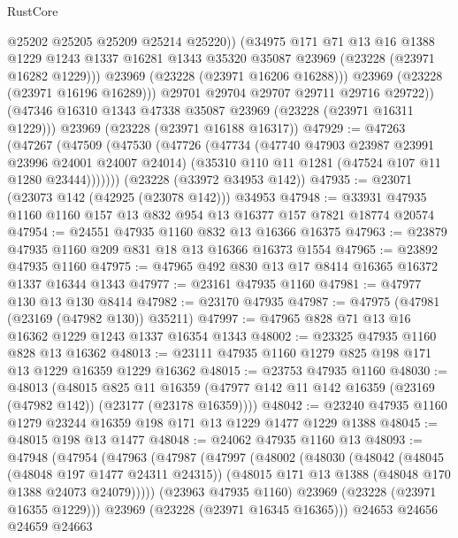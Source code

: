 \begin{lexlean}{RustCore}
\begin{coremodule}
                @25202
                @25205
                @25209
                @25214
                @25220))
            (@34975
              @171
              @71
              @13
              @16
              @1388
              @1229
              @1243
              @1337
              @16281
              @1343
              @35320
              @35087
              @23969
              (@23228 (@23971 @16282 @1229)))
            @23969
            (@23228 (@23971 @16206 @16288)))
          @23969
          (@23228 (@23971 @16196 @16289)))
        @29701
        @29704
        @29707
        @29711
        @29716
        @29722))
    (@47346 @16310 @1343 @47338 @35087 @23969 (@23228 (@23971 @16311 @1229)))
    @23969
    (@23228 (@23971 @16188 @16317))
@47929 := @47263
    (@47267
      (@47509
        (@47530
          (@47726
            (@47734
              (@47740 @47903 @23987 @23991 @23996 @24001 @24007 @24014)
              (@35310 @110 @11 @1281 (@47524 @107 @11 @1280 @23444)))))))
    (@23228 (@33972 @34953 @142))
@47935 := @23071 (@23073 @142 (@42925 (@23078 @142))) @34953
@47948 := @33931 @47935 @1160 @1160 @157 @13 @832 @954 @13 @16377 @157 @7821 @18774 @20574
@47954 := @24551 @47935 @1160 @832 @13 @16366 @16375
@47963 := @23879 @47935 @1160 @209 @831 @18 @13 @16366 @16373 @1554
@47965 := @23892 @47935 @1160
@47975 := @47965 @492 @830 @13 @17 @8414 @16365 @16372 @1337 @16344 @1343
@47977 := @23161 @47935 @1160
@47981 := @47977 @130 @13 @130 @8414
@47982 := @23170 @47935
@47987 := @47975 (@47981 (@23169 (@47982 @130)) @35211)
@47997 := @47965 @828 @71 @13 @16 @16362 @1229 @1243 @1337 @16354 @1343
@48002 := @23325 @47935 @1160 @828 @13 @16362
@48013 := @23111 @47935 @1160 @1279 @825 @198 @171 @13 @1229 @16359 @1229 @16362
@48015 := @23753 @47935 @1160
@48030 := @48013
    (@48015
      @825
      @11
      @16359
      (@47977 @142 @11 @142 @16359 (@23169 (@47982 @142)) (@23177 (@23178 @16359))))
@48042 := @23240 @47935 @1160 @1279 @23244 @16359 @198 @171 @13 @1229 @1477 @1229 @1388
@48045 := @48015 @198 @13 @1477
@48048 := @24062 @47935 @1160 @13
@48093 := @47948
    (@47954
      (@47963
        (@47987
          (@47997
            (@48002
              (@48030
                (@48042
                  (@48045 (@48048 @197 @1477 @24311 @24315))
                  (@48015 @171 @13 @1388 (@48048 @170 @1388 @24073 @24079)))))
            (@23963 @47935 @1160)
            @23969
            (@23228 (@23971 @16355 @1229)))
          @23969
          (@23228 (@23971 @16345 @16365)))
        @24653
        @24656
        @24659
        @24663

\end{coremodule}
\end{lexlean}

